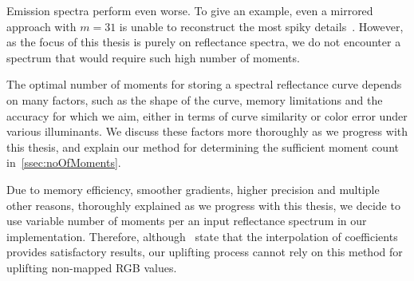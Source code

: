 Emission spectra perform even worse. To give an example, even a mirrored approach with $m=31$ is unable to reconstruct the most spiky details~\cite{trigonometricMomentsPaper}. However, as the focus of this thesis is purely on reflectance spectra, we do not encounter a spectrum that would require such high number of moments.

The optimal number of moments for storing a spectral reflectance curve depends on many factors, such as the shape of the curve, memory limitations and the accuracy for which we aim, either in terms of curve similarity or color error under various illuminants. We discuss these factors more thoroughly as we progress with this thesis, and explain our method for determining the sufficient moment count in~\cref{ssec:noOfMoments}.

Due to memory efficiency, smoother gradients, higher precision and multiple other reasons, thoroughly  explained as we progress with this thesis, we decide to use variable number of moments per an input reflectance spectrum in our implementation. Therefore, although~\citet{trigonometricMomentsPaper} state that the interpolation of coefficients provides satisfactory results, our uplifting process cannot rely on this method for uplifting non-mapped RGB values. 
